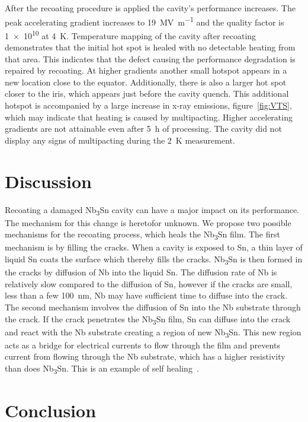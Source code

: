 \documentclass{revtex4-2}
\begin{document}
After the recoating procedure is applied the cavity's performance increases. The peak accelerating gradient increases to \qty{19}{\mega\volt\per\meter} and the quality factor is \num{1e10} at \qty{4}{\kelvin}. Temperature mapping of the cavity after recoating demonstrates that the initial hot spot is healed with no detectable heating from that area. This indicates that the defect causing the performance degradation is repaired by recoating. At higher gradients another small hotspot appears in a new location close to the equator. Additionally, there is also a larger hot spot closer to the iris, which appears just before the cavity quench. This additional hotspot is accompanied by a large increase in x-ray emissions, figure~\ref{fig:VTS}, which may indicate that heating is caused by multipacting. Higher accelerating gradients are not attainable even after \qty{5}{\hour} of processing. The cavity did not display any signs of multipacting during the \qty{2}{\kelvin} measurement.



\section*{Discussion}
\label{sec:Discussion}

Recoating a damaged Nb\textsubscript{3}Sn cavity can have a major impact on its performance. The mechanism for this change is heretofor unknown. We propose two possible mechanisms for the recoating process, which heals the Nb\textsubscript{3}Sn film. The first mechanism is by filling the cracks. When a cavity is exposed to Sn, a thin layer of liquid Sn coats the surface which thereby fills the cracks. Nb\textsubscript{3}Sn is then formed in the cracks by diffusion of Nb into the liquid Sn. The diffusion rate of Nb is relatively slow compared to the diffusion of Sn, however if the cracks are small, less than a few \qty{100}{nm}, Nb may have sufficient time to diffuse into the crack. The second mechanism involves the diffusion of Sn into the Nb substrate through the crack. If the crack penetrates the Nb\textsubscript{3}Sn film, Sn can diffuse into the crack and react with the Nb substrate creating a region of new Nb\textsubscript{3}Sn. This new region acts as a bridge for electrical currents to flow through the film and prevents current from flowing through the Nb substrate, which has a higher resistivity than does Nb\textsubscript{3}Sn. This is an example of self healing~\cite{Sloof2007}.


\section{Conclusion}
\label{sec:Conclusion}
\end{document}
